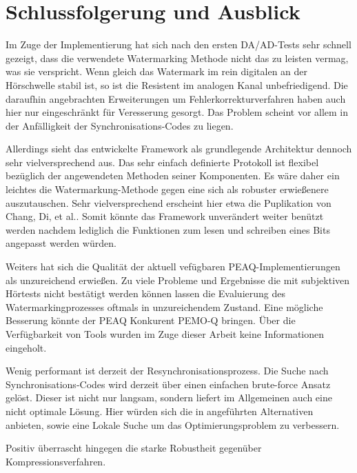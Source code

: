 \chapter{Schlussfolgerung und Ausblick}
\label{ch:ausblick}

Im Zuge der Implementierung hat sich nach den ersten DA/AD-Tests sehr schnell gezeigt, dass die verwendete Watermarking Methode\cite{xiang2007robust} nicht das zu leisten vermag, was sie verspricht. Wenn gleich das Watermark im rein digitalen an der Hörschwelle stabil ist, so ist die Resistent im analogen Kanal unbefriedigend. Die daraufhin angebrachten Erweiterungen um Fehlerkorrekturverfahren haben auch hier nur eingeschränkt für Veresserung gesorgt. Das Problem scheint vor allem in der Anfälligkeit der Synchronisations-Codes zu liegen. 

Allerdings sieht das entwickelte Framework als grundlegende Architektur dennoch sehr vielversprechend aus. Das sehr einfach definierte Protokoll ist flexibel bezüglich der angewendeten Methoden seiner Komponenten. Es wäre daher ein leichtes die Watermarkung-Methode gegen eine sich als robuster erwießenere auszutauschen. Sehr vielversprechend erscheint hier etwa die Puplikation von Chang, Di, et al.\cite{chang2012location}. Somit könnte das Framework unverändert weiter benützt werden nachdem lediglich die Funktionen zum lesen und schreiben eines Bits angepasst werden würden. 

Weiters hat sich die Qualität der aktuell vefügbaren PEAQ-Implementierungen als unzureichend erwießen. Zu viele Probleme und Ergebnisse die mit subjektiven Hörtests nicht bestätigt werden können lassen die Evaluierung des Watermarkingprozesses oftmals in unzureichendem Zustand. Eine mögliche Besserung könnte der PEAQ Konkurent PEMO-Q\cite{huber2006pemo} bringen. Über die Verfügbarkeit von Tools wurden im Zuge dieser Arbeit keine Informationen eingeholt. 

Wenig performant ist derzeit der Re\-synchron\-isations\-prozess. Die Suche nach Synchron\-isations-Codes wird derzeit über einen einfachen brute-force Ansatz gelöst. Dieser ist nicht nur langsam, sondern liefert im Allgemeinen auch eine nicht optimale Lösung. Hier würden sich die in \cite{steinebach2011re} angeführten Alternativen anbieten, sowie eine Lokale Suche um das Optimierungs\-problem zu verbessern. 

Positiv überrascht hingegen die starke Robustheit gegenüber Kompressionsverfahren.